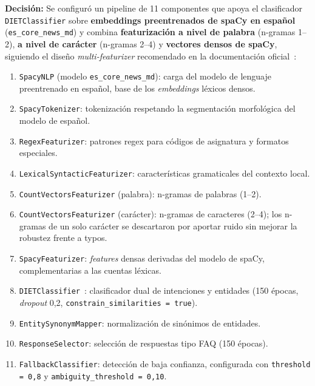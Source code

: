 \textbf{Decisión:} Se configuró un pipeline de 11 componentes que apoya el clasificador \texttt{DIETClassifier} sobre \textbf{embeddings preentrenados de spaCy en español} (\texttt{es\_core\_news\_md}) y combina \textbf{featurización a nivel de palabra} (n-gramas 1--2), \textbf{a nivel de carácter} (n-gramas 2--4) y \textbf{vectores densos de spaCy}, siguiendo el diseño \textit{multi-featurizer} recomendado en la documentación oficial~\cite{rasadocs}:

\begin{enumerate}
    \item \texttt{SpacyNLP} (modelo \texttt{es\_core\_news\_md}): carga del modelo de lenguaje preentrenado en español, base de los \textit{embeddings} léxicos densos.
    \item \texttt{SpacyTokenizer}: tokenización respetando la segmentación morfológica del modelo de español.
    \item \texttt{RegexFeaturizer}: patrones regex para códigos de asignatura y formatos especiales.
    \item \texttt{LexicalSyntacticFeaturizer}: características gramaticales del contexto local.
    \item \texttt{CountVectorsFeaturizer} (palabra): n-gramas de palabras (1--2).
    \item \texttt{CountVectorsFeaturizer} (carácter): n-gramas de caracteres (2--4); los n-gramas de un solo carácter se descartaron por aportar ruido sin mejorar la robustez frente a typos.
    \item \texttt{SpacyFeaturizer}: \textit{features} densas derivadas del modelo de spaCy, complementarias a las cuentas léxicas.
    \item \texttt{DIETClassifier}~\cite{bocklisch2020diet}: clasificador dual de intenciones y entidades (150 épocas, \textit{dropout} 0,2, \texttt{constrain\_similarities = true}).
    \item \texttt{EntitySynonymMapper}: normalización de sinónimos de entidades.
    \item \texttt{ResponseSelector}: selección de respuestas tipo FAQ (150 épocas).
    \item \texttt{FallbackClassifier}: detección de baja confianza, configurada con \texttt{threshold = 0,8} y \texttt{ambiguity\_threshold = 0,10}.
\end{enumerate}

